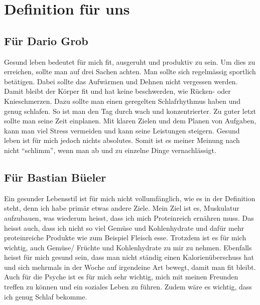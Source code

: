 \section{Definition für uns}
\subsection{Für Dario Grob}
\authortoc{\dario}{\subsectionident}
Gesund leben bedeutet für mich fit, ausgeruht und produktiv zu sein.
\newline
Um dies zu erreichen, sollte man auf drei Sachen achten. 
\newline
Man sollte sich regelmässig sportlich betätigen. Dabei sollte das Aufwärmen und Dehnen nicht vergessen werden. Damit bleibt der Körper fit und hat keine  beschwerden, wie Rücken- oder Knieschmerzen.
\newline
Dazu sollte man einen geregelten Schlafrhythmus haben und genug schlafen. So ist man den Tag durch wach und konzentrierter.
\newline
Zu guter letzt sollte man seine Zeit einplanen. Mit klaren Zielen und dem Planen von Aufgaben, kann man viel Stress vermeiden und kann seine Leistungen steigern.
\newline
Gesund leben ist für mich jedoch nichts absolutes. Somit ist es meiner Meinung nach nicht “schlimm”, wenn man ab und zu einzelne Dinge vernachlässigt.
\subsection{Für Bastian Büeler}
\authortoc{\bastian}{\subsectionident}
Ein gesunder Lebensstil ist für mich nicht vollumfänglich, wie es in der Definition steht, denn ich habe primär etwas andere Ziele. Mein Ziel ist es, Muskulatur aufzubauen, was wiederum heisst, dass ich mich Proteinreich ernähren muss. Das heisst auch, dass ich nicht so viel Gemüse und Kohlenhydrate und dafür mehr proteinreiche Produkte wie zum Beispiel Fleisch esse. Trotzdem ist es für mich wichtig, auch Gemüse/ Früchte und Kohlenhydrate zu mir zu nehmen. Ebenfalls heisst für mich gesund sein, dass man nicht ständig einen Kalorienüberschuss hat und sich mehrmals in der Woche auf irgendeine Art bewegt, damit man fit bleibt. Auch für die Psyche ist es für mich sehr wichtig, mich mit meinen Freunden treffen zu können und ein soziales Leben zu führen. Zudem wäre es wichtig, dass ich genug Schlaf bekomme.
